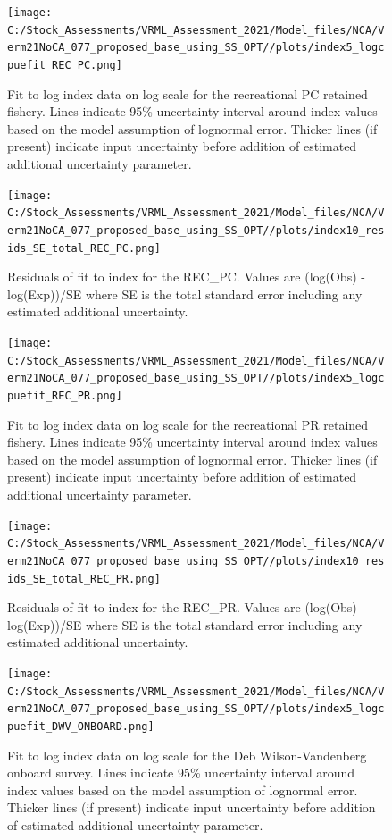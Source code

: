 \documentclass[
  english,
  a4paper,
]{article}
\begin{document}
\FloatBarrier

\FloatBarrier

\begin{figure}
\centering
\texttt{[image: C:/Stock\_Assessments/VRML\_Assessment\_2021/Model\_files/NCA/Verm21NoCA\_077\_proposed\_base\_using\_SS\_OPT//plots/index5\_logcpuefit\_REC\_PC.png]}
\caption{Fit to log index data on log scale for the recreational PC retained fishery. Lines indicate 95\% uncertainty interval around index values based on the model assumption of lognormal error. Thicker lines (if present) indicate input uncertainty before addition of estimated additional uncertainty parameter.\label{fig:log-cpue-REC-PC}}
\end{figure}

\begin{figure}
\centering
\texttt{[image: C:/Stock\_Assessments/VRML\_Assessment\_2021/Model\_files/NCA/Verm21NoCA\_077\_proposed\_base\_using\_SS\_OPT//plots/index10\_resids\_SE\_total\_REC\_PC.png]}
\caption{Residuals of fit to index for the REC\_PC. Values are (log(Obs) - log(Exp))/SE where SE is the total standard error including any estimated additional uncertainty.\label{fig:cpue-resid-REC-PC}}
\end{figure}

\begin{figure}
\centering
\texttt{[image: C:/Stock\_Assessments/VRML\_Assessment\_2021/Model\_files/NCA/Verm21NoCA\_077\_proposed\_base\_using\_SS\_OPT//plots/index5\_logcpuefit\_REC\_PR.png]}
\caption{Fit to log index data on log scale for the recreational PR retained fishery. Lines indicate 95\% uncertainty interval around index values based on the model assumption of lognormal error. Thicker lines (if present) indicate input uncertainty before addition of estimated additional uncertainty parameter.\label{fig:log-cpue-REC-PR}}
\end{figure}

\begin{figure}
\centering
\texttt{[image: C:/Stock\_Assessments/VRML\_Assessment\_2021/Model\_files/NCA/Verm21NoCA\_077\_proposed\_base\_using\_SS\_OPT//plots/index10\_resids\_SE\_total\_REC\_PR.png]}
\caption{Residuals of fit to index for the REC\_PR. Values are (log(Obs) - log(Exp))/SE where SE is the total standard error including any estimated additional uncertainty.\label{fig:cpue-resid-REC-PR}}
\end{figure}

\begin{figure}
\centering
\texttt{[image: C:/Stock\_Assessments/VRML\_Assessment\_2021/Model\_files/NCA/Verm21NoCA\_077\_proposed\_base\_using\_SS\_OPT//plots/index5\_logcpuefit\_DWV\_ONBOARD.png]}
\caption{Fit to log index data on log scale for the Deb Wilson-Vandenberg onboard survey. Lines indicate 95\% uncertainty interval around index values based on the model assumption of lognormal error. Thicker lines (if present) indicate input uncertainty before addition of estimated additional uncertainty parameter.\label{fig:log-cpue-DWV-ONBOARD}}
\end{figure}
\end{document}
